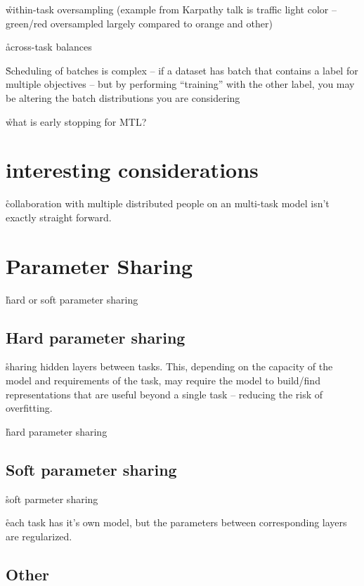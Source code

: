 \r{within-task oversampling (example from Karpathy talk is traffic light color -- green/red oversampled largely compared to orange and other)} 

\r{across-task balances}

\r{Scheduling of batches is complex -- if a dataset has batch that contains a label for multiple objectives -- but by performing ``training'' with the other label, you may be altering the batch distributions you are considering}

\r{what is early stopping for MTL?}

\section{interesting considerations}

\r{collaboration with multiple distributed people on an multi-task model isn't exactly straight forward.}

\section{Parameter Sharing}

\r{hard or soft parameter sharing}

\subsection{Hard parameter sharing}

\r{sharing hidden layers between tasks. This, depending on the capacity of the model and requirements of the task, may require the model to build/find representations that are useful beyond a single task -- reducing the risk of overfitting.}

\r{hard parameter sharing \cite{caruana1993multitask}}


\subsection{Soft parameter sharing}

\r{soft parmeter sharing~\cite{duong2015low}}

\r{each task has it's own model, but the parameters between corresponding layers are regularized.}


\subsection{Other}

